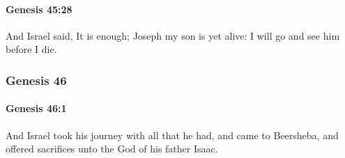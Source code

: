		\paragraph{Genesis 45:28} %
			\label{GENESIS-45-28}

			And Israel said, It is enough; Joseph my son is yet alive: I will go and see him before I die.

	\subsubsection{Genesis 46} %
		\label{GENESIS-46}

		\paragraph{Genesis 46:1} %
			\label{GENESIS-46-1}

			And Israel took his journey with all that he had, and came to Beersheba, and offered sacrifices unto the God of his father Isaac.

